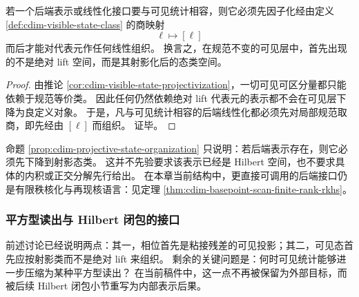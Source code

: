 \begin{proposition}[后端线性化必须先下降到射影类]\label{prop:cdim-projective-state-organization}
若一个后端表示或线性化接口要与可见统计相容，则它必须先因子化经由定义 \ref{def:cdim-visible-state-class} 的商映射
\[
\ell\longmapsto [\ell]
\]
而后才能对代表元作任何线性组织。
换言之，在规范不变的可见层中，首先出现的不是绝对 lift 空间，而是其射影化后的态类空间。
\end{proposition}
\begin{proof}
由推论 \ref{cor:cdim-visible-state-projectivization}，一切可见可区分量都只能依赖于规范等价类。
因此任何仍然依赖绝对 lift 代表元的表示都不会在可见层下降为良定义对象。
于是，凡与可见统计相容的后端线性化都必须先对局部规范取商，即先经由 \([\ell]\) 而组织。
证毕。
\end{proof}

\begin{remark}\label{rem:cdim-projective-state-no-prior-hilbert}
命题 \ref{prop:cdim-projective-state-organization} 只说明：若后端表示存在，则它必须先下降到射影态类。
这并不先验要求该表示已经是 Hilbert 空间，也不要求具体的内积或正交分解先行给出。
在本章当前结构中，更直接可调用的后端接口仍是有限秩核化与再现核语言：见定理 \ref{thm:cdim-basepoint-scan-finite-rank-rkhs}。
\end{remark}

\subsubsection{平方型读出与 Hilbert 闭包的接口}
前述讨论已经说明两点：其一，相位首先是粘接残差的可见投影；其二，可见态首先应按射影类而不是绝对 lift 来组织。
剩余的关键问题是：何时可见统计能够进一步压缩为某种平方型读出？
在当前稿件中，这一点不再被保留为外部目标，而被后续 Hilbert 闭包小节重写为内部表示后果。

